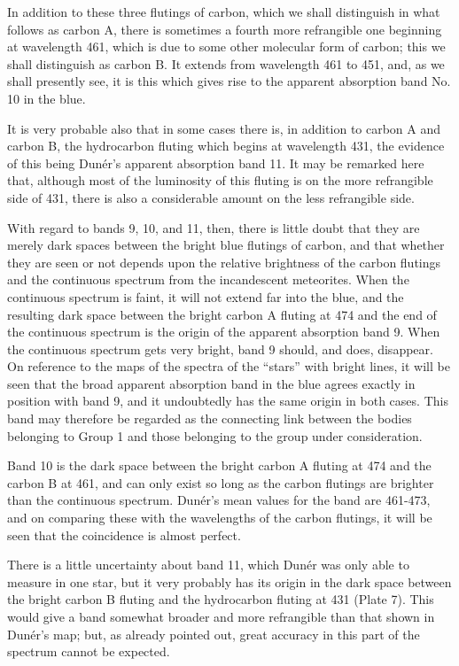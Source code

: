 \documentclass[a4paper, 12pt, oneside, polutonikogreek, english]{article}
\begin{document}
In addition to these three flutings of carbon, which we shall distinguish in what follows as carbon A, there is sometimes a fourth more refrangible one beginning at wavelength 461, which is due to some other molecular form of carbon; this we shall distinguish as carbon B. It extends from wavelength 461 to 451, and, as we shall presently see, it is this which gives rise to the apparent absorption band No. 10 in the blue.

It is very probable also that in some cases there is, in addition to carbon A and carbon B, the hydrocarbon fluting which begins at wavelength 431, the evidence of this being Dunér's apparent absorption band 11. It may be remarked here that, although most of the luminosity of this fluting is on the more refrangible side of 431, there is also a considerable amount on the less refrangible side.

With regard to bands 9, 10, and 11, then, there is little doubt that they are merely dark spaces between the bright blue flutings of carbon, and that whether they are seen or not depends upon the relative brightness of the carbon flutings and the continuous spectrum from the incandescent meteorites. When the continuous spectrum is faint, it will not extend far into the blue, and the resulting dark space between the bright carbon A fluting at 474 and the end of the continuous spectrum is the origin of the apparent absorption band 9. When the continuous spectrum gets very bright, band 9 should, and does, disappear. On reference to the maps of the spectra of the ``stars'' with bright lines, it will be seen that the broad apparent absorption band in the blue agrees exactly in position with band 9, and it undoubtedly has the same origin in both cases. This band may therefore be regarded as the connecting link between the bodies belonging to Group 1 and those belonging to the group under consideration.

Band 10 is the dark space between the bright carbon A fluting at 474 and the carbon B at 461, and can only exist so long as the carbon flutings are brighter than the continuous spectrum. Dunér's mean values for the band are 461-473, and on comparing these with the wavelengths of the carbon flutings, it will be seen that the coincidence is almost perfect.

There is a little uncertainty about band 11, which Dunér was only able to measure in one star, but it very probably has its origin in the dark space between the bright carbon B fluting and the hydrocarbon fluting at 431 (Plate 7). This would give a band somewhat broader and more refrangible than that shown in Dunér's map; but, as already pointed out, great accuracy in this part of the spectrum cannot be expected.
\end{document}
